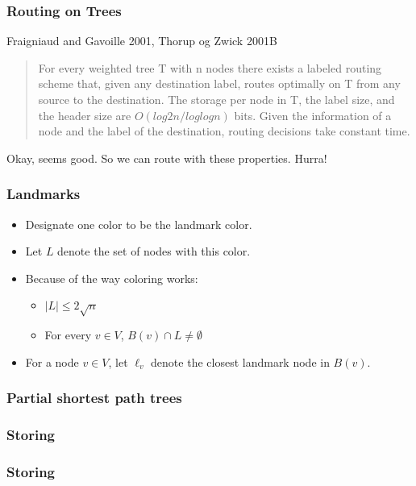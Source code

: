 \documentclass[10pt, compress]{beamer}
\begin{document}
\begin{frame}[fragile]
  \frametitle{Routing on Trees}
    \begin{block}{Fraigniaud and Gavoille 2001, Thorup og Zwick 2001B}
        \begin{quote}
        For every weighted tree T with n nodes there exists a labeled routing
        scheme that, given any destination label, routes optimally on T from any
        source to the destination. The storage per node in T, the label size, and
        the header size are $O(log2 n/ log log n)$ bits. Given the information of
        a node and the label of the destination, routing decisions take constant
        time.
        \end{quote}
    \end{block}
    Okay, seems good. So we can route with these properties. Hurra!
\end{frame}

\begin{frame}[fragile]
  \frametitle{Landmarks}
  \begin{itemize}
    \item Designate one color to be the landmark color.
    \item Let $L$ denote the set of nodes with this color.
    \item Because of the way coloring works:
    \begin{itemize}
        \item $|L| \leq 2 \sqrt{n}$
        \item For every $v\in V$, $B(v)\cap L \neq \emptyset$
    \end{itemize}
    \item For a node $v\in V$, let $\ell_v$ denote the closest landmark node in $B(v)$.
  \end{itemize}
\end{frame}

\begin{frame}[fragile]
  \frametitle{Partial shortest path trees}


\end{frame}

\begin{frame}[fragile]
  \frametitle{Storing}


\end{frame}

\begin{frame}[fragile]
  \frametitle{Storing}


\end{frame}
\end{document}
